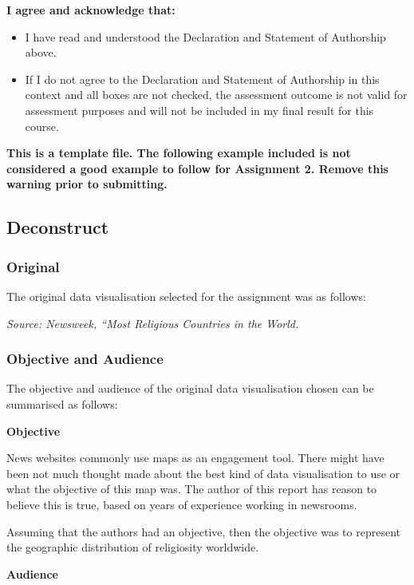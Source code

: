 \documentclass[
]{article}
\begin{document}
\textbf{I agree and acknowledge that:}

\begin{itemize}
\item
  I have read and understood the Declaration and Statement of Authorship
  above.
\item
  If I do not agree to the Declaration and Statement of Authorship in
  this context and all boxes are not checked, the assessment outcome is
  not valid for assessment purposes and will not be included in my final
  result for this course.
\end{itemize}

\textbf{This is a template file. The following example included is not
considered a good example to follow for Assignment 2. Remove this
warning prior to submitting.}

\subsection{Deconstruct}\label{deconstruct}

\subsubsection{Original}\label{original}

The original data visualisation selected for the assignment was as
follows:

\emph{Source: Newsweek, ``Most Religious Countries in the World.}

\subsubsection{Objective and Audience}\label{objective-and-audience}

The objective and audience of the original data visualisation chosen can
be summarised as follows:

\textbf{Objective}

News websites commonly use maps as an engagement tool. There might have
been not much thought made about the best kind of data visualisation to
use or what the objective of this map was. The author of this report has
reason to believe this is true, based on years of experience working in
newsrooms.

Assuming that the authors had an objective, then the objective was to
represent the geographic distribution of religiosity worldwide.

\textbf{Audience}
\end{document}
